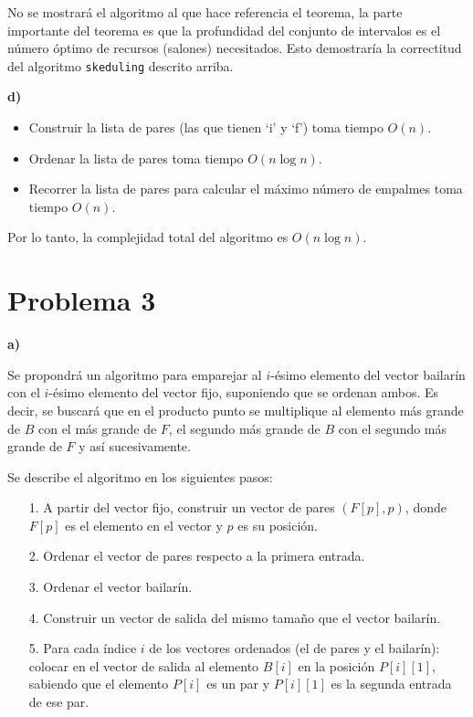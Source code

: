 \documentclass{article}
\begin{document}
No se mostrará el algoritmo al que hace referencia el teorema, la parte importante del teorema es que la profundidad del conjunto de intervalos es el número óptimo de recursos (salones) necesitados. Esto demostraría la correctitud del algoritmo \texttt{skeduling} descrito arriba.

\textbf{d)}

\begin{itemize}
\item Construir la lista de pares (las que tienen `i' y `f') toma tiempo $O(n)$.
\item Ordenar la lista de pares toma tiempo $O(n \log n)$.
\item Recorrer la lista de pares para calcular el máximo número de empalmes toma tiempo $O(n)$.
\end{itemize}

Por lo tanto, la complejidad total del algoritmo es $O(n \log n)$.

\section*{Problema 3}

\textbf{a)}

Se propondrá un algoritmo para emparejar al $i$-ésimo elemento del vector bailarín con el $i$-ésimo elemento del vector fijo, suponiendo que se ordenan ambos. Es decir, se buscará que en el producto punto se multiplique al elemento más grande de $B$ con el más grande de $F$, el segundo más grande de $B$ con el segundo más grande de $F$ y así sucesivamente.

Se describe el algoritmo en los siguientes pasos:
\begin{itemize}
\item[1.] A partir del vector fijo, construir un vector de pares $(F[p], p)$, donde $F[p]$ es el elemento en el vector y $p$ es su posición.
\item[2.] Ordenar el vector de pares respecto a la primera entrada.
\item[3.] Ordenar el vector bailarín.
\item[4.] Construir un vector de salida del mismo tamaño que el vector bailarín.
\item[5.] Para cada índice $i$ de los vectores ordenados (el de pares y el bailarín): colocar en el vector de salida al elemento $B[i]$ en la posición $P[i][1]$, sabiendo que el elemento $P[i]$ es un par y $P[i][1]$ es la segunda entrada de ese par.
\end{itemize}
\end{document}
